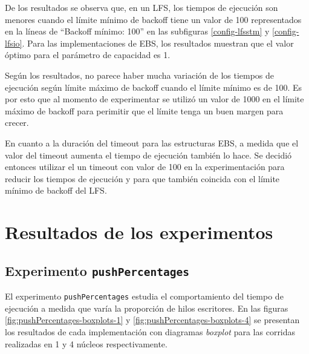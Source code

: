 \begin{appendices}
De los resultados se observa que, en un LFS, los tiempos de ejecución son menores cuando el límite mínimo de backoff tiene un valor de 100 representados en la líneas de ``Backoff mínimo: 100'' en las subfiguras \ref{config-lfsstm} y \ref{config-lfsio}.
Para las implementaciones de EBS, los resultados muestran que el valor óptimo para el parámetro de capacidad es 1.

Según los resultados, no parece haber mucha variación de los tiempos de ejecución según límite máximo de backoff cuando el límite mínimo es de 100. Es por esto que al momento de experimentar se utilizó un valor de 1000 en el límite máximo de backoff para perimitir que el límite tenga un buen margen para crecer.

En cuanto a la duración del timeout para las estructuras EBS, a medida que el valor del timeout aumenta el tiempo de ejecución también lo hace. Se decidió entonces utilizar el un timeout con valor de 100 en la experimentación para reducir los tiempos de ejecución y para que también coincida con el límite mínimo de backoff del LFS.

\clearpage
\chapter{Resultados de los experimentos}\label{ch:otherResults}
\section{Experimento \texttt{pushPercentages}}\label{app-pushPercentages}

El experimento \texttt{pushPercentages} estudia el comportamiento del tiempo de ejecución a medida que varía la proporción de hilos escritores. En las figuras \ref{fig:pushPercentages-boxplots-1} y \ref{fig:pushPercentages-boxplots-4} se presentan los resultados de cada implementación con diagramas \emph{boxplot} para las corridas realizadas en 1 y 4 núcleos respectivamente.


\end{appendices}
